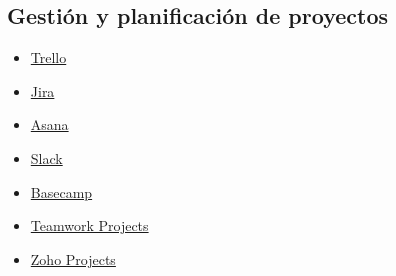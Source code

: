 \subsection{Gestión y planificación de proyectos}
\begin{multicols}{2}
\begin{itemize}[nosep]
\item \href{https://trello.com/}{Trello}
\item \href{https://es.atlassian.com/software/jira}{Jira}
\item \href{https://asana.com/}{Asana}
\item \href{https://slack.com/}{Slack}
\item \href{https://basecamp.com/}{Basecamp}
\item \href{https://www.teamwork.com/project-management-software}{Teamwork Projects}
\item \href{https://www.zoho.com/projects/}{Zoho Projects}
\end{itemize}
\end{multicols}


